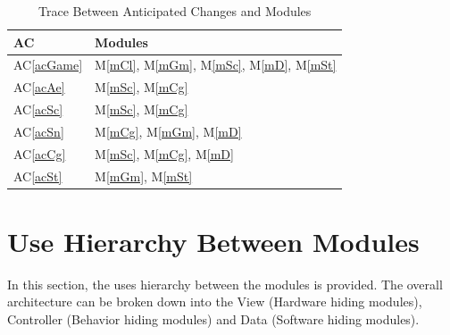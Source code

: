 \documentclass[12pt, titlepage]{article}
\newcommand{\acref}[1]{AC\ref{#1}}
\newcommand{\mref}[1]{M\ref{#1}}
\begin{document}
\begin{table}[!htbp]
\centering
\begin{tabular}{p{} p{}}
\toprule
\textbf{AC} & \textbf{Modules}\\
\midrule
\acref{acGame} & \mref{mCl}, \mref{mGm}, \mref{mSc}, \mref{mD}, \mref{mSt} \\
\acref{acAe} & \mref{mSc}, \mref{mCg}\\
\acref{acSc} & \mref{mSc}, \mref{mCg}\\
\acref{acSn} & \mref{mCg}, \mref{mGm}, \mref{mD} \\
\acref{acCg} & \mref{mSc},  \mref{mCg}, \mref{mD}\\
\acref{acSt} & \mref{mGm}, \mref{mSt} \\
\bottomrule
\end{tabular}
\caption{Trace Between Anticipated Changes and Modules}
\label{TblACT}
\end{table}

\section{Use Hierarchy Between Modules} \label{SecUse}


In this section, the uses hierarchy between the modules is provided. The overall architecture can be broken down into the View (Hardware hiding modules), Controller (Behavior hiding modules) and Data (Software hiding modules). \\

\bigskip
\end{document}

